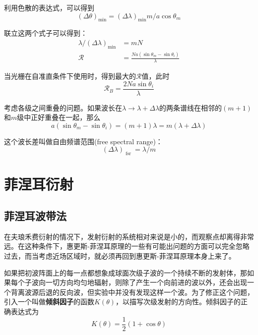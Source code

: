 \documentclass[UTF8]{ctexart}
\begin{document}
	利用色散的表达式，可以得到
	\begin{equation}
	(\Delta \theta)_{\min }=(\Delta \lambda)_{\min } m / a \cos \theta_{m}
	\end{equation}

\noindent 联立这两个式子可以得到：
\begin{equation}
	\begin{aligned}
	\lambda /(\Delta \lambda)_{\min }&=m N\\
	\mathscr{R}&=\frac{N a\left(\sin \theta_{m}-\sin \theta_{i}\right)}{\lambda}
	\end{aligned}
\end{equation}

\noindent 当光栅在自准直条件下使用时，得到最大的$ \mathscr{R} $值，此时
\begin{equation}
\mathscr{R}_{B}=\frac{2 N a \sin \theta_{i}}{\lambda}
\end{equation}

	考虑各级之间重叠的问题。如果波长在$ \lambda \rightarrow \lambda+\Delta \lambda $的两条谱线在相邻的$ (m+1) $和$ m $级中正好重叠在一起，那么
	\begin{equation}
	a\left(\sin \theta_{m}-\sin \theta_{i}\right)=(m+1) \lambda=m(\lambda+\Delta \lambda)
	\end{equation}
	
\noindent 这个波长差叫做自由频谱范围(free spectral range)：
\begin{equation}
(\Delta \lambda)_{\text { fsr }}=\lambda / m
\end{equation}

	\section{菲涅耳衍射}
	\subsection{菲涅耳波带法}
	在夫琅禾费衍射的情况下，发射衍射的系统相对来说是小的，而观察点却离得非常远。在这种条件下，惠更斯-菲涅耳原理的一些有可能出问题的方面可以完全忽略过去，而当考虑近场区域时，就必须再回到惠更斯-菲涅耳原理本身上来了。
	
	如果把初波阵面上的每一点都想象成球面次级子波的一个持续不断的发射体，那如果每个子波向一切方向均匀地辐射，则除了产生一个向前进的波以外，还会出现一个背离波源后退的反向波，但实验中并没有发现这样一个波。为了修正这个问题，引入一个叫做\textbf{倾斜因子}的函数$ K(\theta) $，以描写次级发射的方向性。倾斜因子的正确表达式为
	\begin{equation}
	K(\theta)=\frac{1}{2}(1+\cos \theta)
	\end{equation}
	
\end{document}
